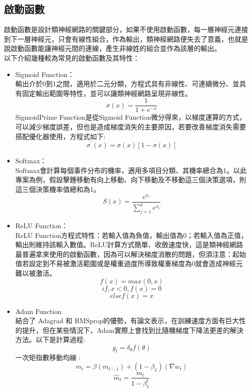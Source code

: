 \documentclass[14pt,a4paper]{report}  %
\begin{document}
\subsection{啟動函數}
啟動函數是設計類神經網路的關鍵部分，如果不使用啟動函數，每一層神經元連接到下一層神經元，只會有線性組合，作為輸出，類神經網路便失去了意義，也就是說啟動函數能讓神經元間的連線，產生非線姓的組合並作為該層的輸出。\\
以下介紹幾種較為常見的啟動函數及其特性：
\begin{itemize}
\item Sigmoid Function：\\
輸出介於0到1之間，適用於二元分類，方程式具有非線性、可連續微分、並具有固定輸出範圍等特性，並可以讓類神經網路呈現非線性。\\
$$\sigma(x)=\frac{1}{1+e^{-x}}$$
SigmoidPrime Function是從Sigmoid Function微分得來，以梯度運算的方式，可以減少梯度誤差，但也是造成梯度消失的主要原因，若要改善梯度消失需要搭配優化器使用，方程式如下:\\
$$\sigma^{'}(x)=\sigma(x)[1-\sigma(x)]$$
\item Softmax：\\
Softmax會計算每個事件分布的機率，適用多項目分類、其機率總合為1。以此專案為例，假設擊錘移動有向上移動、向下移動及不移動這三個決策選項，則這三個決策機率值總和為1。\\
$$S(x)=\frac{e^{x_i}}{\sum^k_{j=1}e^{x_i}}$$
\item ReLU Function：\\
ReLU Function方程式特性：若輸入值為負值，輸出值為0；若輸入值為正值，輸出則維持該輸入數值。ReLU計算方式簡單、收斂速度快，這是類神經網路最普遍拿來使用的啟動函數，因為可以解決梯度消散的問題，但須注意：起始值若設定到不易被激活範圍或是權重過度所導致權重梯度為0就會造成神經元難以被激活。\\
$$f(x)=max(0,x)$$
$$if , x<0 , f(x)=0$$
$$else f(x)=x$$
\item Adam Function\\
結合了 Adagrad 和 RMSprop的優勢，有論文表示，在訓練速度方面有巨大性的提升，但在某些情況下，Adam實際上會找到比隨機梯度下降法更差的解決方法。以下是計算過程:\\
$$g_t=\delta_{\theta}f(\theta)$$
一次矩指數移動均線 :\\
$$m_t =\beta(m_{t-1})+(1-\beta_1)(\nabla{w_t})$$
$$\hat m_t=\frac{m_t}{1-\beta_1^t}$$

\end{itemize}
\end{document}
